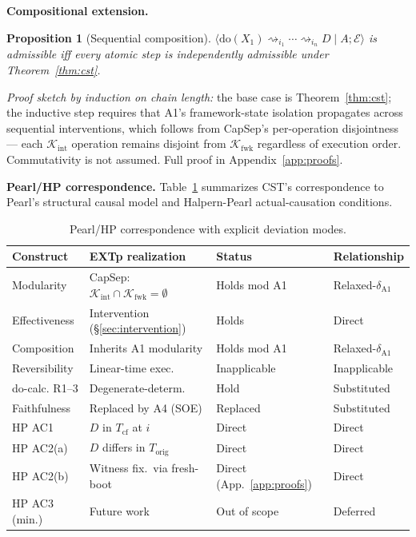 \documentclass[conference]{IEEEtran}
\newtheorem{proposition}{Proposition}
\newcommand{\Korig}{T_\text{orig}}
\newcommand{\Tcf}{T_\text{cf}}
\newcommand{\Kint}{\mathcal{K}_\text{int}}
\newcommand{\Kfwk}{\mathcal{K}_\text{fwk}}
\begin{document}
\textbf{Compositional extension.}
\begin{proposition}[Sequential composition]\label{prop:seq}
$\langle \text{do}(X_1) \rightsquigarrow_{i_1} \cdots
\rightsquigarrow_{i_n} D \mid A; \mathcal{E}\rangle$ is admissible
iff every atomic step is independently admissible under
Theorem~\ref{thm:cst}.
\end{proposition}

\emph{Proof sketch by induction on chain length:} the base case is
Theorem~\ref{thm:cst}; the inductive step requires that A1's
framework-state isolation propagates across sequential interventions,
which follows from CapSep's per-operation disjointness --- each
$\Kint$ operation remains disjoint from $\Kfwk$ regardless of
execution order. Commutativity is not assumed. Full proof in
Appendix~\ref{app:proofs}.

\textbf{Pearl/HP correspondence.}
Table~\ref{tab:pearl} summarizes CST's correspondence to Pearl's
structural causal model and Halpern-Pearl actual-causation
conditions.

\begin{table}[tb]
  \caption{Pearl/HP correspondence with explicit deviation modes.}
  \label{tab:pearl}
  \centering
  \footnotesize
  \begin{tabular}{@{}p{}p{}p{}p{}@{}}
  \toprule
  Construct & EXTp realization & Status & Relationship \\
  \midrule
  Modularity      & CapSep: $\Kint \cap \Kfwk = \emptyset$ & Holds mod A1     & Relaxed-$\delta_{\text{A1}}$ \\
  Effectiveness   & Intervention (\S\ref{sec:intervention})       & Holds            & Direct \\
  Composition     & Inherits A1 modularity         & Holds mod A1     & Relaxed-$\delta_{\text{A1}}$ \\
  Reversibility   & Linear-time exec.              & Inapplicable     & Inapplicable \\
  do-calc. R1--3  & Degenerate-determ.             & Hold             & Substituted \\
  Faithfulness    & Replaced by A4 (SOE)           & Replaced         & Substituted \\
  HP AC1          & $D$ in $\Tcf$ at $i$           & Direct           & Direct \\
  HP AC2(a)       & $D$ differs in $\Korig$        & Direct           & Direct \\
  HP AC2(b)       & Witness fix.\ via fresh-boot   & Direct (App.~\ref{app:proofs}) & Direct \\
  HP AC3 (min.)   & Future work                    & Out of scope     & Deferred \\
  \bottomrule
  \end{tabular}
\end{table}
\end{document}
